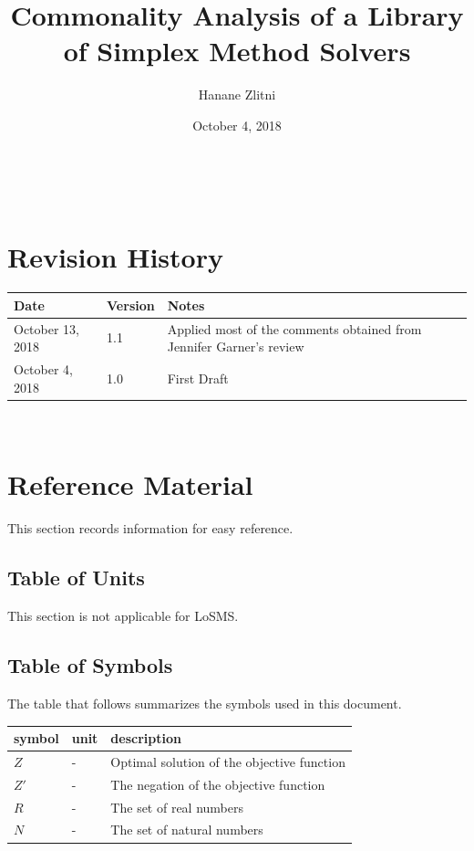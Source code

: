 \documentclass[12pt]{article}
\newcommand{\famname}{LoSMS} %
\begin{document}
\title{Commonality Analysis of a Library of Simplex Method Solvers} 
\author{Hanane Zlitni}
\date{October 4, 2018}

\maketitle

~\newpage


\section{Revision History}

\begin{tabularx}{\textwidth}{p{3cm}p{2cm}X}
	\toprule {\bf Date} & {\bf Version} & {\bf Notes}\\
	\midrule
	October 13, 2018 & 1.1 & Applied most of the comments obtained from 
	Jennifer Garner's review\\
	October 4, 2018 & 1.0 & First Draft\\
	\bottomrule
\end{tabularx}

~\newpage
	
\section{Reference Material}

This section records information for easy reference.

\subsection{Table of Units}

This section is not applicable for \famname{}.

\subsection{Table of Symbols}

The table that follows summarizes the symbols used in this document.

\renewcommand{\arraystretch}{1.2}
\noindent \begin{longtable*}{l l p{12cm}} \toprule
\textbf{symbol} & \textbf{unit} & \textbf{description}\\
\midrule 
	$Z$ & - & Optimal solution of the objective function\\
	$Z'$ & - & The negation of the objective function\\
	$R$ & - & The set of real numbers\\
	$N$ & - & The set of natural numbers\\
\bottomrule
\end{longtable*}
\end{document}
